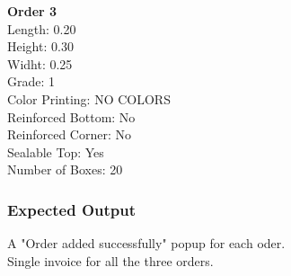 \documentclass[12pt]{article}
\begin{document}
\textbf{Order 3}\\
Length: 0.20\\
Height: 0.30\\
Widht: 0.25\\
Grade: 1\\
Color Printing: NO COLORS\\
Reinforced Bottom: No\\
Reinforced Corner: No\\
Sealable Top: Yes\\
Number of Boxes: 20\\
\subsubsection{Expected Output}
A "Order added successfully" popup for each oder.\\
Single invoice for all the three orders.
\end{document}
